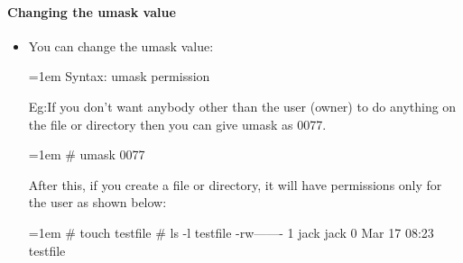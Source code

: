 \begin{flushleft}
\newpage
		
		
	\paragraph{Changing the umask value}
	\begin{itemize}
		\item You can change the umask value:
		\bigskip
		\begin{tcolorbox}[breakable,notitle,boxrule=0pt,colback=pink,colframe=pink]
			\color{black}
			\font=1em
			Syntax: umask permission
			\font=4pt
		\end{tcolorbox}
		Eg:If you don’t want anybody other than the user (owner) to do anything on the file or directory then you can give umask as 0077.
		\bigskip
		\begin{tcolorbox}[breakable,notitle,boxrule=-0pt,colback=black,colframe=black]
			\color{green}
			\font=1em
			\# umask 0077
			\font=4pt
		\end{tcolorbox}
		\bigskip
		After this, if you create a file or directory, it will have permissions only for the user
		as shown below:
		\bigskip
		\begin{tcolorbox}[breakable,notitle,boxrule=-0pt,colback=black,colframe=black]
			\color{green}
			\font=1em
			\# touch testfile
			\newline
			\# ls -l testfile
			\newline
			\color{white}
			-rw------- 1 jack jack 0 Mar 17 08:23 testfile
			\font=4pt
		\end{tcolorbox}
		
	\end{itemize}

	
\end{flushleft}

\newpage

